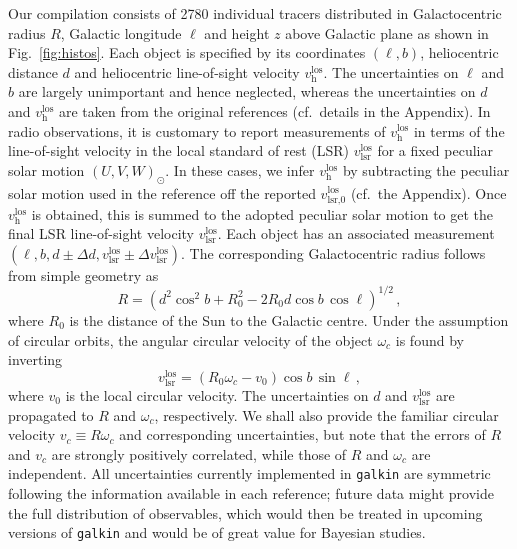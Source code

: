 \documentclass[twocolumn,prd,reprint,preprintnumbers,amsmath,amssymb,superscriptaddress,nofootinbib]{revtex4}
\begin{document}
\par Our compilation consists of 2780 individual tracers distributed in Galactocentric radius $R$, Galactic longitude $\ell$ and height $z$ above Galactic plane as shown in Fig.~\ref{fig:histos}. Each object is specified by its coordinates $(\ell,b)$, heliocentric distance $d$ and heliocentric line-of-sight velocity $v_{\textrm{h}}^{\textrm{los}}$. The uncertainties on $\ell$ and $b$ are largely unimportant and hence neglected, whereas the uncertainties on $d$ and $v_{\textrm{h}}^{\textrm{los}}$ are taken from the original references (cf.~details in the Appendix). In radio observations, it is customary to report measurements of $v_{\textrm{h}}^{\textrm{los}}$ in terms of the line-of-sight velocity in the local standard of rest (LSR) $v_{\textrm{lsr}}^{\textrm{los}}$ for a fixed peculiar solar motion $(U,V,W)_{\odot}$. In these cases, we infer $v_{\textrm{h}}^{\textrm{los}}$ by subtracting the peculiar solar motion used in the reference off the reported $v_{\textrm{lsr,0}}^{\textrm{los}}$ (cf.~the Appendix). Once $v_{\textrm{h}}^{\textrm{los}}$ is obtained, this is summed to the adopted peculiar solar motion to get the final LSR line-of-sight velocity $v_{\textrm{lsr}}^{\textrm{los}}$. Each object has an associated measurement $(\ell,b,d\pm\Delta d,v_{\textrm{lsr}}^{\textrm{los}} \pm \Delta v_{\textrm{lsr}}^{\textrm{los}})$. The corresponding Galactocentric radius follows from simple geometry as
\begin{equation}\label{eq:R}
R=(d^2 \cos^2 b + R_0^2 - 2 R_0 d \cos b \, \cos \ell)^{1/2} \, ,
\end{equation}
where $R_0$ is the distance of the Sun to the Galactic centre. Under the assumption of circular orbits, the angular circular velocity of the object $\omega_c$ is found by inverting
\begin{equation}\label{eq:vlos}
v_{\textrm{lsr}}^{\textrm{los}} = \left( R_0\omega_c - v_0  \right) \cos b \, \sin \ell \, ,
\end{equation}
where $v_0$ is the local circular velocity. The uncertainties on $d$ and $v_{\textrm{lsr}}^{\textrm{los}}$ are propagated to $R$ and $\omega_c$, respectively. We shall also provide the familiar circular velocity $v_c\equiv R\omega_c$ and corresponding uncertainties, but note that the errors of $R$ and $v_c$ are strongly positively correlated, while those of $R$ and $\omega_c$ are independent.
All uncertainties currently implemented in \texttt{galkin} are symmetric following the information available in each reference; future data might provide the full distribution of observables, which would then be treated in upcoming versions of \texttt{galkin} and would be of great value for Bayesian studies. 
\end{document}
